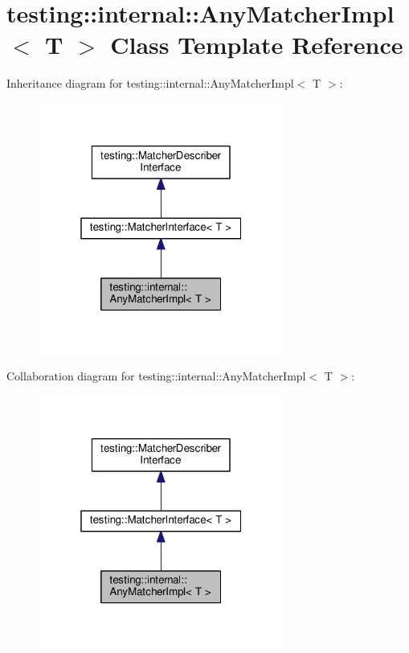 \hypertarget{classtesting_1_1internal_1_1AnyMatcherImpl}{}\section{testing\+:\+:internal\+:\+:Any\+Matcher\+Impl$<$ T $>$ Class Template Reference}
\label{classtesting_1_1internal_1_1AnyMatcherImpl}


Inheritance diagram for testing\+:\+:internal\+:\+:Any\+Matcher\+Impl$<$ T $>$\+:\nopagebreak
\begin{figure}[H]
\begin{center}
\leavevmode
\includegraphics[width=229pt]{classtesting_1_1internal_1_1AnyMatcherImpl__inherit__graph}
\end{center}
\end{figure}


Collaboration diagram for testing\+:\+:internal\+:\+:Any\+Matcher\+Impl$<$ T $>$\+:\nopagebreak
\begin{figure}[H]
\begin{center}
\leavevmode
\includegraphics[width=229pt]{classtesting_1_1internal_1_1AnyMatcherImpl__coll__graph}
\end{center}
\end{figure}
